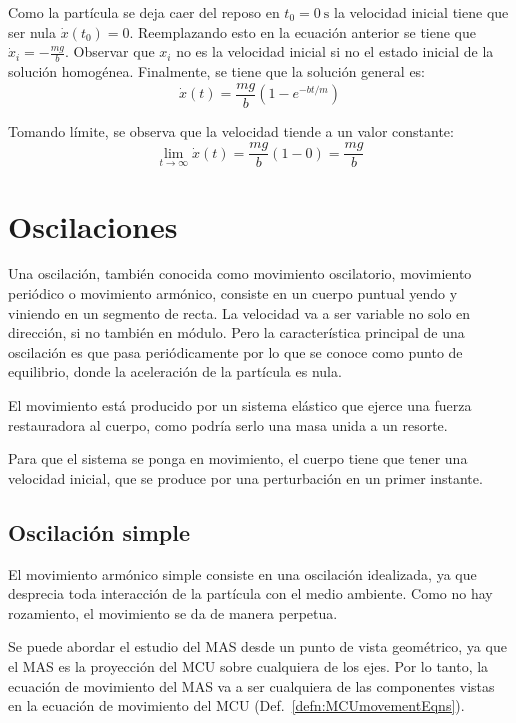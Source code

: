 \documentclass[a5paper,12pt,twoside]{book}
\begin{document}
Como la partícula se deja caer del reposo en $t_0 = \SI{0}{\second}$ la velocidad inicial tiene que ser nula $\dot{x}(t_0) = 0$. Reemplazando esto en la ecuación anterior se tiene que $\dot{x}_i = -\frac{mg}{b}$. Observar que $x_i$ no es la velocidad inicial si no el estado inicial de la solución homogénea. Finalmente, se tiene que la solución general es:
\[ \dot{x}(t) = \frac{mg}{b} \left( 1-e^{-bt/m} \right) \]

Tomando límite, se observa que la velocidad tiende a un valor constante:
\[ \lim_{t \to \infty} \dot{x}(t) = \frac{mg}{b} (1-0) = \frac{mg}{b} \]

\begin{center}
    \vspace{-2cm}
    \def\svgwidth{\linewidth}
    
    \vspace{-2cm}
\end{center}


\chapter{Oscilaciones} %

Una oscilación, también conocida como movimiento oscilatorio, movimiento periódico o movimiento armónico, consiste en un cuerpo puntual yendo y viniendo en un segmento de recta. La velocidad va a ser variable no solo en dirección, si no también en módulo. Pero la característica principal de una oscilación es que pasa periódicamente por lo que se conoce como punto de equilibrio, donde la aceleración de la partícula es nula.

El movimiento está producido por un sistema elástico que ejerce una fuerza restauradora al cuerpo, como podría serlo una masa unida a un resorte.

Para que el sistema se ponga en movimiento, el cuerpo tiene que tener una velocidad inicial, que se produce por una perturbación en un primer instante.

\section{Oscilación simple}

El movimiento armónico simple consiste en una oscilación idealizada, ya que desprecia toda interacción de la partícula con el medio ambiente. Como no hay rozamiento, el movimiento se da de manera perpetua.

Se puede abordar el estudio del MAS desde un punto de vista geométrico, ya que el MAS es la proyección del MCU sobre cualquiera de los ejes. Por lo tanto, la ecuación de movimiento del MAS va a ser cualquiera de las componentes vistas en la ecuación de movimiento del MCU (Def.\ \ref{defn:MCUmovementEqns}).
\end{document}
